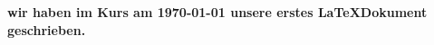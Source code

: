 \documentclass{article}
\begin{document}
\begin{center} 
\textbf{wir haben im Kurs am \today{} unsere erstes \LaTeX{}Dokument geschrieben.}
\end{center}
\end{document}
